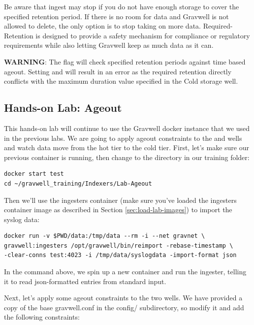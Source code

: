 {{Be aware that ingest may stop if you do not have enough storage to cover the
specified retention period. If there is no room for data and Gravwell is not
allowed to delete, the only option is to stop taking on more data.
Required-Retention is designed to provide a safety mechanism for compliance
or regulatory requirements while also letting Gravwell keep as much data as it can.


\textbf{WARNING}: The  flag will check specified retention
periods against time based ageout. Setting  and
 will result in an error as the required retention
directly conflicts with the maximum duration value specified in the Cold storage well.

\clearpage
\subsection{Hands-on Lab: Ageout}

This hands-on lab will continue to use the Gravwell docker instance
that we used in the previous labs. We are going to apply ageout
constraints to the  and  wells and watch data move
from the hot tier to the cold tier. First, let's make sure our previous
container is running, then change to the  directory in
our training folder:

\begin{Verbatim}[breaklines=true]
docker start test
cd ~/gravwell_training/Indexers/Lab-Ageout
\end{Verbatim}

Then we'll use the ingesters container (make sure you've loaded the ingesters container image as described in Section \ref{sec:load-lab-images}) to import the syslog data:
\begin{Verbatim}[breaklines=true]
docker run -v $PWD/data:/tmp/data --rm -i --net gravnet \
gravwell:ingesters /opt/gravwell/bin/reimport -rebase-timestamp \
-clear-conns test:4023 -i /tmp/data/syslogdata -import-format json
\end{Verbatim}


In the command above, we spin up a new container and run the  ingester, telling it to read json-formatted entries from standard input.

Next, let's apply some ageout constraints to the two wells. We have provided a copy of the
base gravwell.conf in the config/ subdirectory, so modify it and add the following constraints:

}}
